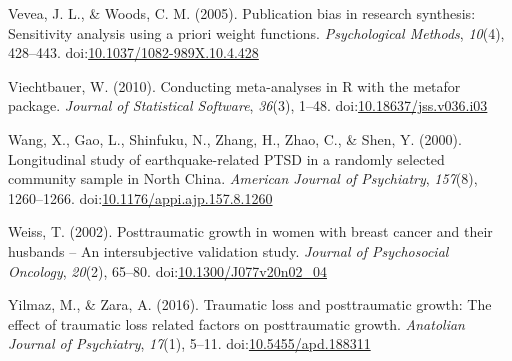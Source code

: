 \documentclass[,man]{apa6}
\begin{document}
\leavevmode\hypertarget{ref-Vevea2005}{}%
Vevea, J. L., \& Woods, C. M. (2005). Publication bias in research synthesis: Sensitivity analysis using a priori weight functions. \emph{Psychological Methods}, \emph{10}(4), 428--443. doi:\href{https://doi.org/10.1037/1082-989X.10.4.428}{10.1037/1082-989X.10.4.428}

\leavevmode\hypertarget{ref-Viechtbauer2010}{}%
Viechtbauer, W. (2010). Conducting meta-analyses in R with the metafor package. \emph{Journal of Statistical Software}, \emph{36}(3), 1--48. doi:\href{https://doi.org/10.18637/jss.v036.i03}{10.18637/jss.v036.i03}

\leavevmode\hypertarget{ref-Wang2000}{}%
Wang, X., Gao, L., Shinfuku, N., Zhang, H., Zhao, C., \& Shen, Y. (2000). Longitudinal study of earthquake-related PTSD in a randomly selected community sample in North China. \emph{American Journal of Psychiatry}, \emph{157}(8), 1260--1266. doi:\href{https://doi.org/10.1176/appi.ajp.157.8.1260}{10.1176/appi.ajp.157.8.1260}

\leavevmode\hypertarget{ref-Weiss2002}{}%
Weiss, T. (2002). Posttraumatic growth in women with breast cancer and their husbands -- An intersubjective validation study. \emph{Journal of Psychosocial Oncology}, \emph{20}(2), 65--80. doi:\href{https://doi.org/10.1300/J077v20n02_04}{10.1300/J077v20n02\_04}

\leavevmode\hypertarget{ref-Yilmaz2016}{}%
Yilmaz, M., \& Zara, A. (2016). Traumatic loss and posttraumatic growth: The effect of traumatic loss related factors on posttraumatic growth. \emph{Anatolian Journal of Psychiatry}, \emph{17}(1), 5--11. doi:\href{https://doi.org/10.5455/apd.188311}{10.5455/apd.188311}
\end{document}
